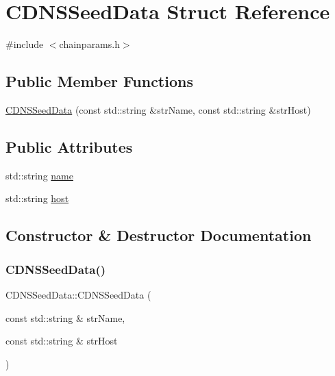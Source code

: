 \hypertarget{struct_c_d_n_s_seed_data}{}\section{C\+D\+N\+S\+Seed\+Data Struct Reference}
\label{struct_c_d_n_s_seed_data}


{\ttfamily \#include $<$chainparams.\+h$>$}

\subsection*{Public Member Functions}
\begin{DoxyCompactItemize}
\item 
\mbox{\hyperlink{struct_c_d_n_s_seed_data_a4152b594beb9800fb7611e3c47f03499}{C\+D\+N\+S\+Seed\+Data}} (const std\+::string \&str\+Name, const std\+::string \&str\+Host)
\end{DoxyCompactItemize}
\subsection*{Public Attributes}
\begin{DoxyCompactItemize}
\item 
std\+::string \mbox{\hyperlink{struct_c_d_n_s_seed_data_a2cf084b163340bd62b67e765799f1fdd}{name}}
\item 
std\+::string \mbox{\hyperlink{struct_c_d_n_s_seed_data_a70f5da8568016651cfb7ec7dbf01b3f0}{host}}
\end{DoxyCompactItemize}


\subsection{Constructor \& Destructor Documentation}
\mbox{\label{struct_c_d_n_s_seed_data_a4152b594beb9800fb7611e3c47f03499}} 
\subsubsection{\texorpdfstring{C\+D\+N\+S\+Seed\+Data()}{CDNSSeedData()}}
{\footnotesize\ttfamily C\+D\+N\+S\+Seed\+Data\+::\+C\+D\+N\+S\+Seed\+Data (\begin{DoxyParamCaption}\item[{const std\+::string \&}]{str\+Name,  }\item[{const std\+::string \&}]{str\+Host }\end{DoxyParamCaption})\hspace{0.3cm}{\ttfamily [inline]}}



